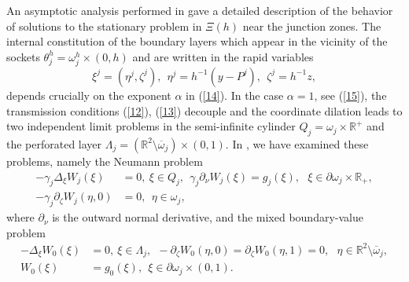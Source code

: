\documentclass[11pt]{article}%
\numberwithin{equation}{section}
\begin{document}
An asymptotic analysis performed in \cite{BuCaNa1} gave a detailed description
of the behavior of solutions to the stationary problem in $\Xi(h)$ near the
junction zones. The internal constitution of the boundary layers which appear
in the vicinity of the sockets $\theta_{j}^{h}=\omega_{j}^{h}\times(0,h)$ and
are written in the rapid variables%
\begin{equation}
\xi^{j}=(\eta^{j},\zeta^{j}),\ \ \eta^{j}=h^{-1}(y-P^{j}),\ \ \zeta^{j}%
=h^{-1}z, \label{B1}%
\end{equation}
depends crucially on the exponent $\alpha$ in (\ref{14}). In the case
$\alpha=1$, see (\ref{15}), the transmission conditions (\ref{12}), (\ref{13})
decouple and the coordinate dilation leads to two independent limit problems
in the semi-infinite cylinder $Q_{j}=\omega_{j}\times\mathbb{R}^{+}$ and the
perforated layer $\Lambda_{j}=(\mathbb{R}^{2}\setminus\overline{\omega}%
_{j})\times(0,1)$. In \cite[Sect. 2.4]{BuCaNa1}, we have examined these
problems, namely the Neumann problem%
\begin{align}
-\gamma_{j}\Delta_{\xi}W_{j}\left(  \xi\right)   &  =0,\ \xi\in Q_{j}%
,\ \ \gamma_{j}\partial_{\nu}W_{j}\left(  \xi\right)  =g_{j}\left(
\xi\right)  ,\ \ \ \xi\in\partial\omega_{j}\times\mathbb{R}_{+},\label{B2}\\
-\gamma_{j}\partial_{\zeta}W_{j}\left(  \eta,0\right)   &  =0,\ \ \eta
\in\omega_{j},\nonumber
\end{align}
where $\partial_{\nu}$ is the outward normal derivative, and the mixed
boundary-value problem%
\begin{align}
-\Delta_{\xi}W_{0}\left(  \xi\right)   &  =0,\ \xi\in\Lambda_{j}%
,\ \ -\partial_{\zeta}W_{0}\left(  \eta,0\right)  =\partial_{\zeta}%
W_{0}\left(  \eta,1\right)  =0,\ \ \ \eta\in\mathbb{R}^{2}\setminus
\overline{\omega}_{j},\label{B3}\\
W_{0}\left(  \xi\right)   &  =g_{0}\left(  \xi\right)  ,\ \ \xi\in
\partial\omega_{j}\times(0,1).\nonumber
\end{align}
\end{document}
